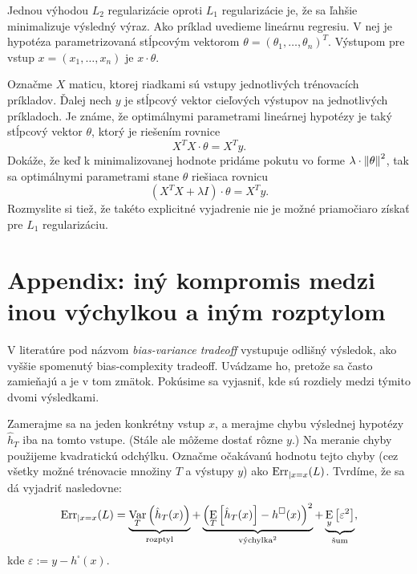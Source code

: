 \begin{exercise}
  Jednou výhodou $L_2$ regularizácie oproti $L_1$ regularizácie je, že
  sa ľahšie minimalizuje výsledný výraz. Ako príklad uvedieme lineárnu
  regresiu. V nej je hypotéza parametrizovaná stĺpcovým vektorom
  $\theta = (\theta_1, \ldots, \theta_n)^T$. Výstupom pre vstup
  $x = (x_1, \ldots, x_n)$ je $x \cdot \theta$. 
  
  Označme $X$ maticu, ktorej riadkami sú vstupy jednotlivých trénovacích
  príkladov. Ďalej nech $y$ je stĺpcový vektor cieľových výstupov na
  jednotlivých príkladoch. Je známe, že optimálnymi parametrami
  lineárnej hypotézy je taký stĺpcový vektor $\theta$, ktorý je riešením
  rovnice
  $$X^T X \cdot \theta = X^T y.$$
  Dokáže, že keď k minimalizovanej hodnote pridáme pokutu vo forme
  $\lambda \cdot \left\lVert\theta\right\rVert^2$, tak sa optimálnymi parametrami stane
  $\theta$ riešiaca rovnicu
  $$(X^T X + \lambda I) \cdot \theta = X^T y.$$
  Rozmyslite si tiež, že takéto explicitné vyjadrenie nie je možné
  priamočiaro získať pre $L_1$ regularizáciu.
\end{exercise}




\section{Appendix: iný kompromis medzi inou výchylkou a iným rozptylom}

V literatúre pod názvom \emph{bias-variance tradeoff} vystupuje odlišný
výsledok, ako vyššie spomenutý bias-complexity tradeoff. Uvádzame ho,
pretože sa často zamieňajú a je v tom zmätok. Pokúsime sa vyjasniť, kde
sú rozdiely medzi týmito dvomi výsledkami.

\begin{theorem}
  Zamerajme sa na jeden konkrétny vstup $x$, a merajme chybu výslednej
  hypotézy $\hat{h}_T$ iba na tomto vstupe. (Stále ale môžeme dostať
  rôzne $y$.) Na meranie chyby použijeme kvadratickú odchýlku. Označme
  očakávanú hodnotu tejto chyby (cez všetky možné trénovacie
  množiny $T$ a výstupy $y$) ako $\mathrm{Err}_{|x=x}(L)$. Tvrdíme, že
  sa dá vyjadriť nasledovne:
  $$
    \mathrm{Err}_{|x=x}(L)
      = \underbrace{\operatorname*{\mathrm{Var}}_T \left( \hat{h}_T(x) \right)}_{\text{\normalfont rozptyl}}
      + \underbrace{\left( \operatorname*{\mathrm{E}}_T \left[ \hat{h}_T(x) \right] - h^\square(x) \right)^2}_{\text{\normalfont výchylka}^2}
      + \underbrace{\operatorname*{\mathrm{E}}_y \left[ \varepsilon^2 \right]}_{\text{\normalfont šum}},
  $$
  kde $\varepsilon := y - h^\square(x)$.
\end{theorem}

